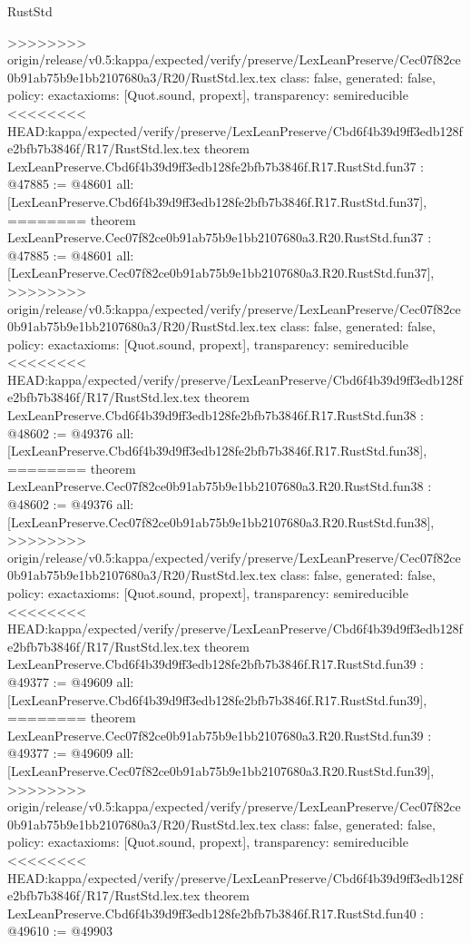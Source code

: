 \begin{lexlean}{RustStd}
\begin{coremodule}
{\begin{coremodule}
{{{{{{{{{{{{{{{{{{{{{{{{{{{{{{{{{{{{{{{{>>>>>>>> origin/release/v0.5:kappa/expected/verify/preserve/LexLeanPreserve/Cec07f82ce0b91ab75b9e1bb2107680a3/R20/RustStd.lex.tex
  class: false,
  generated: false,
  policy: exact{axioms: [Quot.sound, propext]},
  transparency: semireducible
}
<<<<<<<< HEAD:kappa/expected/verify/preserve/LexLeanPreserve/Cbd6f4b39d9ff3edb128fe2bfb7b3846f/R17/RustStd.lex.tex
theorem LexLeanPreserve.Cbd6f4b39d9ff3edb128fe2bfb7b3846f.R17.RustStd.fun37 : @47885 := @48601 {
  all: [LexLeanPreserve.Cbd6f4b39d9ff3edb128fe2bfb7b3846f.R17.RustStd.fun37],
========
theorem LexLeanPreserve.Cec07f82ce0b91ab75b9e1bb2107680a3.R20.RustStd.fun37 : @47885 := @48601 {
  all: [LexLeanPreserve.Cec07f82ce0b91ab75b9e1bb2107680a3.R20.RustStd.fun37],
>>>>>>>> origin/release/v0.5:kappa/expected/verify/preserve/LexLeanPreserve/Cec07f82ce0b91ab75b9e1bb2107680a3/R20/RustStd.lex.tex
  class: false,
  generated: false,
  policy: exact{axioms: [Quot.sound, propext]},
  transparency: semireducible
}
<<<<<<<< HEAD:kappa/expected/verify/preserve/LexLeanPreserve/Cbd6f4b39d9ff3edb128fe2bfb7b3846f/R17/RustStd.lex.tex
theorem LexLeanPreserve.Cbd6f4b39d9ff3edb128fe2bfb7b3846f.R17.RustStd.fun38 : @48602 := @49376 {
  all: [LexLeanPreserve.Cbd6f4b39d9ff3edb128fe2bfb7b3846f.R17.RustStd.fun38],
========
theorem LexLeanPreserve.Cec07f82ce0b91ab75b9e1bb2107680a3.R20.RustStd.fun38 : @48602 := @49376 {
  all: [LexLeanPreserve.Cec07f82ce0b91ab75b9e1bb2107680a3.R20.RustStd.fun38],
>>>>>>>> origin/release/v0.5:kappa/expected/verify/preserve/LexLeanPreserve/Cec07f82ce0b91ab75b9e1bb2107680a3/R20/RustStd.lex.tex
  class: false,
  generated: false,
  policy: exact{axioms: [Quot.sound, propext]},
  transparency: semireducible
}
<<<<<<<< HEAD:kappa/expected/verify/preserve/LexLeanPreserve/Cbd6f4b39d9ff3edb128fe2bfb7b3846f/R17/RustStd.lex.tex
theorem LexLeanPreserve.Cbd6f4b39d9ff3edb128fe2bfb7b3846f.R17.RustStd.fun39 : @49377 := @49609 {
  all: [LexLeanPreserve.Cbd6f4b39d9ff3edb128fe2bfb7b3846f.R17.RustStd.fun39],
========
theorem LexLeanPreserve.Cec07f82ce0b91ab75b9e1bb2107680a3.R20.RustStd.fun39 : @49377 := @49609 {
  all: [LexLeanPreserve.Cec07f82ce0b91ab75b9e1bb2107680a3.R20.RustStd.fun39],
>>>>>>>> origin/release/v0.5:kappa/expected/verify/preserve/LexLeanPreserve/Cec07f82ce0b91ab75b9e1bb2107680a3/R20/RustStd.lex.tex
  class: false,
  generated: false,
  policy: exact{axioms: [Quot.sound, propext]},
  transparency: semireducible
}
<<<<<<<< HEAD:kappa/expected/verify/preserve/LexLeanPreserve/Cbd6f4b39d9ff3edb128fe2bfb7b3846f/R17/RustStd.lex.tex
theorem LexLeanPreserve.Cbd6f4b39d9ff3edb128fe2bfb7b3846f.R17.RustStd.fun40 : @49610 := @49903 {
}}}}}}}}}}}}}}}}}}}}}}}}}}}}}}}}}}}}}}}}}}}
\end{coremodule}}
\end{coremodule}
\end{lexlean}
